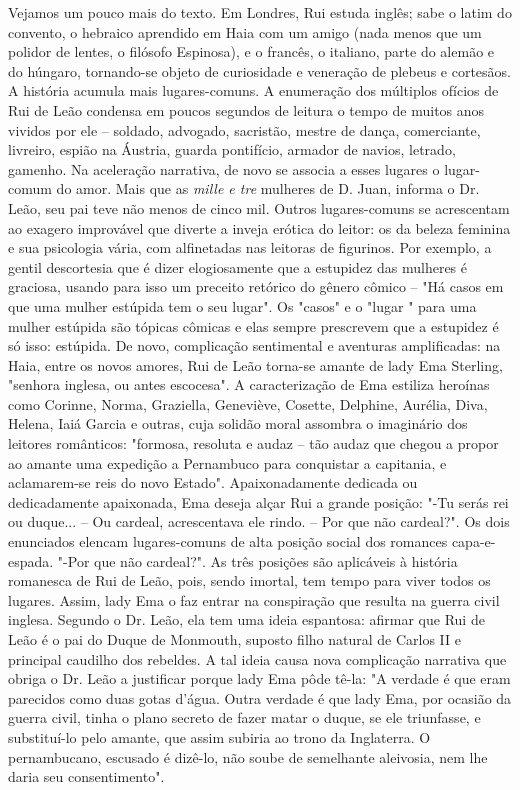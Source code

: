 Vejamos um pouco mais do texto. Em Londres, Rui estuda inglês; sabe o
latim do convento, o hebraico aprendido em Haia com um amigo (nada menos
que um polidor de lentes, o filósofo Espinosa), e o francês, o italiano,
parte do alemão e do húngaro, tornando-se objeto de curiosidade e
veneração de plebeus e cortesãos. A história acumula mais
lugares-comuns. A enumeração dos múltiplos ofícios de Rui de Leão
condensa em poucos segundos de leitura o tempo de muitos anos vividos
por ele -- soldado, advogado, sacristão, mestre de dança, comerciante,
livreiro, espião na Áustria, guarda pontifício, armador de navios,
letrado, gamenho. Na aceleração narrativa, de novo se associa a esses
lugares o lugar-comum do amor. Mais que as \emph{mille e tre} mulheres
de D. Juan, informa o Dr. Leão, seu pai teve não menos de cinco mil.
Outros lugares-comuns se acrescentam ao exagero improvável que diverte a
inveja erótica do leitor: os da beleza feminina e sua psicologia vária,
com alfinetadas nas leitoras de figurinos. Por exemplo, a gentil
descortesia que é dizer elogiosamente que a estupidez das mulheres é
graciosa, usando para isso um preceito retórico do gênero cômico -- "Há
casos em que uma mulher estúpida tem o seu lugar". Os "casos" e o "lugar
" para uma mulher estúpida são tópicas cômicas e elas sempre prescrevem
que a estupidez é só isso: estúpida. De novo, complicação sentimental e
aventuras amplificadas: na Haia, entre os novos amores, Rui de Leão
torna-se amante de lady Ema Sterling, "senhora inglesa, ou antes
escocesa". A caracterização de Ema estiliza heroínas como Corinne,
Norma, Graziella, Geneviève, Cosette, Delphine, Aurélia, Diva, Helena,
Iaiá Garcia e outras, cuja solidão moral assombra o imaginário dos
leitores românticos: "formosa, resoluta e audaz -- tão audaz que chegou
a propor ao amante uma expedição a Pernambuco para conquistar a
capitania, e aclamarem-se reis do novo Estado". Apaixonadamente dedicada
ou dedicadamente apaixonada, Ema deseja alçar Rui a grande posição: "-Tu
serás rei ou duque... -- Ou cardeal, acrescentava ele rindo. -- Por que
não cardeal?". Os dois enunciados elencam lugares-comuns de alta posição
social dos romances capa-e-espada. "-Por que não cardeal?". As três
posições são aplicáveis à história romanesca de Rui de Leão, pois, sendo
imortal, tem tempo para viver todos os lugares. Assim, lady Ema o faz
entrar na conspiração que resulta na guerra civil inglesa. Segundo o Dr.
Leão, ela tem uma ideia espantosa: afirmar que Rui de Leão é o pai do
Duque de Monmouth, suposto filho natural de Carlos II e principal
caudilho dos rebeldes. A tal ideia causa nova complicação narrativa que
obriga o Dr. Leão a justificar porque lady Ema pôde tê-la: "A verdade é
que eram parecidos como duas gotas d'água. Outra verdade é que lady Ema,
por ocasião da guerra civil, tinha o plano secreto de fazer matar o
duque, se ele triunfasse, e substituí-lo pelo amante, que assim subiria
ao trono da Inglaterra. O pernambucano, escusado é dizê-lo, não soube de
semelhante aleivosia, nem lhe daria seu consentimento".

